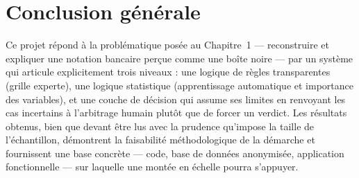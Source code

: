 \section{Conclusion générale}

Ce projet répond à la problématique posée au Chapitre~1 — reconstruire et expliquer une
notation bancaire perçue comme une boîte noire — par un système qui articule explicitement trois
niveaux : une logique de règles transparentes (grille experte), une logique statistique
(apprentissage automatique et importance des variables), et une couche de décision qui assume
ses limites en renvoyant les cas incertains à l'arbitrage humain plutôt que de forcer un verdict.
Les résultats obtenus, bien que devant être lus avec la prudence qu'impose la taille de
l'échantillon, démontrent la faisabilité méthodologique de la démarche et fournissent une base
concrète — code, base de données anonymisée, application fonctionnelle — sur laquelle une montée
en échelle pourra s'appuyer.
